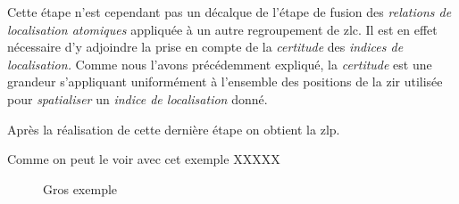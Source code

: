 Cette étape n'est cependant pas un décalque de l'étape de fusion des
\emph{relations de localisation atomiques} appliquée à un autre
regroupement de \ac{zlc}. Il est en effet nécessaire d'y adjoindre la
prise en compte de la \emph{certitude} des \emph{indices de
  localisation.} Comme nous l'avons précédemment expliqué, la
\emph{certitude} est une grandeur s'appliquant uniformément à
l'ensemble des positions de la \ac{zir} utilisée pour
\emph{spatialiser} un \emph{indice de localisation} donné.

Après la réalisation de cette dernière étape on obtient la \ac{zlp}.

Comme on peut le voir avec cet exemple XXXXX

\begin{landscape}
  \begin{figure}[H]
    \centering
    
    \caption{Gros exemple}
    \label{fig:exemple_final_fusion}
  \end{figure}
\end{landscape}



